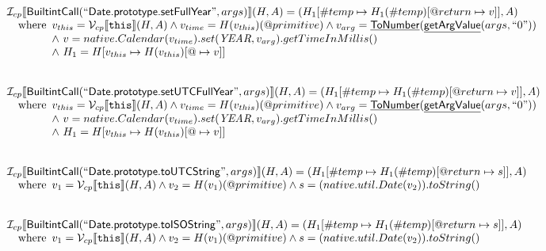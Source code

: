 \documentclass{article}
\makeatletter
\newcommand{\SF}[1]{\mbox{\textsf{#1}}}
\newcommand{\TT}[1]{\mbox{\texttt{#1}}}
\newcommand{\wherec}[1]{{\rm where}\begin{array}[t]{l}#1\end{array}}
\newcommand{\I}{\mathcal{I}}
\newcommand{\V}{\mathcal{V}}
\newcommand{\lbr}{\llbracket}
\newcommand{\rbr}{\rrbracket}
\newcommand{\hf}[1]{\underline{\sf #1}}
\newcommand{\varprop}[1]{@#1}
\makeatother
\begin{document}
\[\begin{array}{l}
\I _{cp}\lbr \SF{BuiltintCall}(``\SF{Date.prototype.setFullYear}",args)\rbr(H,A)
  = (H_1[\#temp \mapsto H_1(\#temp)[@return \mapsto v]], A)\\
\quad\wherec{
  v_{this} = \V _{cp}\lbr \TT{this}\rbr (H,A) \land v_{time} = H(v_{this})(@primitive)
  \land v_{arg} = \hf{ToNumber}(\hf{getArgValue}(args, ``0"))\\
  \land\ v = native.Calendar(v_{time}).set(\emph{YEAR}, v_{arg}).getTimeInMillis()\\
  \land\ H_1 = H[v_{this} \mapsto H(v_{this})[\varprop \mapsto v]]
  }\\
\\\\


\I _{cp}\lbr \SF{BuiltintCall}(``\SF{Date.prototype.setUTCFullYear}",args)\rbr(H,A)
  = (H_1[\#temp \mapsto H_1(\#temp)[@return \mapsto v]], A)\\
\quad\wherec{
  v_{this} = \V _{cp}\lbr \TT{this}\rbr (H,A) \land v_{time} = H(v_{this})(@primitive)
  \land v_{arg} = \hf{ToNumber}(\hf{getArgValue}(args, ``0"))\\
  \land\ v = native.Calendar(v_{time}).set(\emph{YEAR}, v_{arg}).getTimeInMillis()\\
  \land\ H_1 = H[v_{this} \mapsto H(v_{this})[\varprop \mapsto v]]
  }\\
\\\\


\I _{cp}\lbr \SF{BuiltintCall}(``\SF{Date.prototype.toUTCString}",args)\rbr(H,A)
  = (H_1[\#temp \mapsto H_1(\#temp)[@return \mapsto s]], A)\\
\quad\wherec{
  v_1 = \V _{cp}\lbr \TT{this}\rbr (H,A) \land v_2 = H(v_1)(@primitive)
  \land s = (native.util.Date(v_2)).toString()
  }\\
\\\\


\I _{cp}\lbr \SF{BuiltintCall}(``\SF{Date.prototype.toISOString}",args)\rbr(H,A)
  = (H_1[\#temp \mapsto H_1(\#temp)[@return \mapsto s]], A)\\
\quad\wherec{
  v_1 = \V _{cp}\lbr \TT{this}\rbr (H,A) \land v_2 = H(v_1)(@primitive)
  \land s = (native.util.Date(v_2)).toString()
  }\\
\\\\

\end{array}
\]
\end{document}
